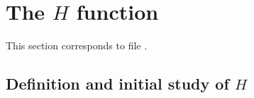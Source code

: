 \documentclass[a4paper,11pt]{article}
\begin{document}

\section{The $H$ function}

This section corresponds to file .

\subsection{Definition and initial study of $H$}
\end{document}
